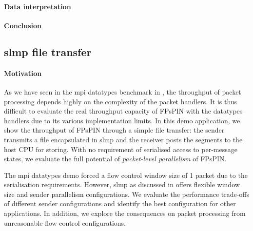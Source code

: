 \paragraph{Data interpretation}

\paragraph{Conclusion}



\subsection{\acs{slmp} file transfer}

\paragraph{Motivation} As we have seen in the \ac{mpi} datatypes benchmark in , the throughput of packet processing depends highly on the complexity of the packet handlers.  It is thus difficult to evaluate the real throughput capacity of FPsPIN with the datatypes handlers due to its various implementation limits.  In this demo application, we show the throughput of FPsPIN through a simple file transfer: the sender transmits a file encapsulated in \ac{slmp} and the receiver posts the segments to the host CPU for storing.  With no requirement of serialised access to per-message states, we evaluate the full potential of \emph{packet-level parallelism} of FPsPIN.

The \ac{mpi} datatypes demo forced a flow control window size of 1 packet due to the serialisation requirements.  However, \ac{slmp} as discussed in  offers flexible window size and sender parallelism configurations.  We evaluate the performance trade-offs of different sender configurations and identify the best configuration for other applications.  In addition, we explore the consequences on packet processing from unreasonable flow control configurations.

